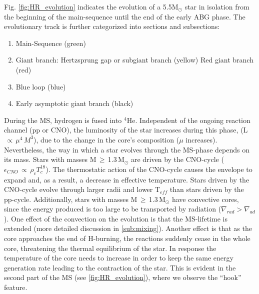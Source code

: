 Fig. \ref{fig:HR_evolution} indicates the evolution of a 5.5M$_{\odot}$ star in isolation from the beginning of the main-sequence until the end of the early ABG phase. The evolutionary track is further categorized into sections and subsections: 

\begin{enumerate}
    \item Main-Sequence (green)
    \item Giant branch: 
        \subitem Hertzsprung gap or subgiant branch (yellow) 
        \subitem Red giant branch (red)
    \item Blue loop (blue)
    \item Early asymptotic giant branch (black)
\end{enumerate}

During the MS, hydrogen is fused into $^4$He. Independent of the ongoing reaction channel (pp or CNO), the luminosity of the star increases during this phase, (L$\,\propto\,\mu^{4}\,M^3$), due to the change in the core's composition ($\mu$ increases). Nevertheless, the way in which a star evolves through the MS-phase depends on its mass. Stars with masses M\,$\geq$\,1.3\,M$_\odot$ are driven by the CNO-cycle ($\epsilon_{CNO}\,\propto\,\rho_{c}T^{18}_{c}$). The thermostatic action of the CNO-cycle causes the envelope to expand and, as a result, a decrease in effective temperature. Stars driven by the CNO-cycle evolve through larger radii and lower T$_{eff}$ than stars driven by the pp-cycle. Additionally, stars with masses M\,$\geq$\,1.3\,M$_\odot$ have convective cores, since the energy produced is too large to be transported by radiation ($\nabla_{rad} > \nabla_{ad}$). One effect of the convection on the evolution is that the MS-lifetime is extended (more detailed discussion in \cref{sub:mixing}). Another effect is that as the core approaches the end of H-burning, the reactions suddenly cease in the whole core, threatening the thermal equilibrium of the star. In response the temperature of the core needs to increase in order to keep the same energy generation rate leading to the contraction of the star. This is evident in the second part of the MS (see \cref{fig:HR_evolution}), where we observe the ``hook'' feature. 

